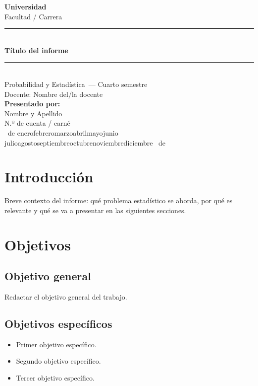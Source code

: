 \documentclass[11pt,letterpaper]{article}
\renewcommand{\today}{\number\day\ de \ifcase\month\or
  enero\or febrero\or marzo\or abril\or mayo\or junio\or
  julio\or agosto\or septiembre\or octubre\or noviembre\or diciembre\fi
  \ de \number\year}
\newcommand{\tituloInforme}{Título del informe}
\newcommand{\nombreEstudiante}{Nombre y Apellido}
\newcommand{\numeroCuenta}{N.º de cuenta / carné}
\newcommand{\nombreMateria}{Probabilidad y Estadística}
\newcommand{\nombreProfesor}{Nombre del/la docente}
\newcommand{\semestre}{Cuarto semestre}
\newcommand{\fechaEntrega}{\today}
\begin{document}
\begin{titlepage}
    \centering
    \vspace*{1.5cm}
    {\Large \textbf{Universidad}}\\[0.3cm]
    {\large Facultad / Carrera}\\[2.5cm]

    {\color{accent}\rule{\linewidth}{1.2pt}}\\[0.4cm]
    {\Huge \bfseries \tituloInforme}\\[0.4cm]
    {\color{accent}\rule{\linewidth}{1.2pt}}\\[2cm]

    {\large \nombreMateria\ --- \semestre}\\[0.3cm]
    {\large Docente: \nombreProfesor}\\[2.5cm]

    {\large \textbf{Presentado por:}}\\
    {\large \nombreEstudiante}\\
    {\large \numeroCuenta}\\[2.5cm]

    \vfill
    {\large \fechaEntrega}
\end{titlepage}

\tableofcontents
\newpage

\section{Introducción}
Breve contexto del informe: qué problema estadístico se aborda, por qué es relevante
y qué se va a presentar en las siguientes secciones.

\section{Objetivos}
\subsection{Objetivo general}
Redactar el objetivo general del trabajo.

\subsection{Objetivos específicos}
\begin{itemize}
    \item Primer objetivo específico.
    \item Segundo objetivo específico.
    \item Tercer objetivo específico.
\end{itemize}
\end{document}
